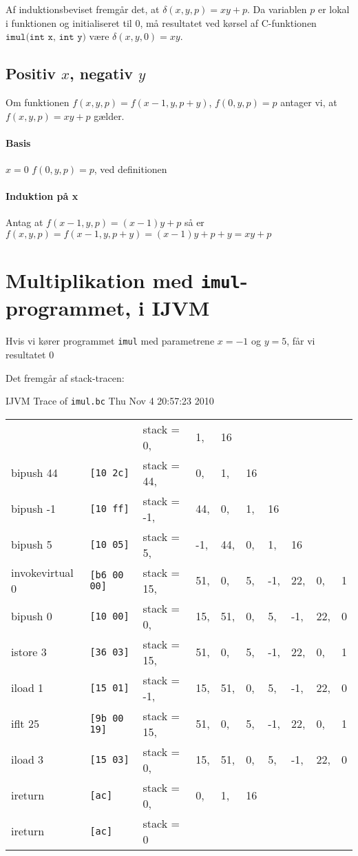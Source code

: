 \documentclass[12pt,a4paper]{article}
\newcommand{\imul}{\texttt{imul}}
\begin{document}
Af induktionsbeviset fremgår det, at $\delta(x,y,p)=xy+p$. Da variablen $p$ er
lokal i funktionen og initialiseret til $0$, må resultatet ved kørsel af
C-funktionen $\texttt{imul(int x, int y)}$ være $\delta(x,y,0)=xy$.

\subsection{Positiv $x$, negativ $y$}

Om funktionen $f(x, y, p) = f(x-1, y, p+y)$, $f(0, y, p) = p$ antager vi, at $f(x, y, p) = xy+p$ gælder.
\paragraph{Basis} $x = 0$
$f(0, y, p) = p$, ved definitionen
\paragraph{Induktion på x}
Antag at $f(x-1, y, p) = (x-1)y+p$
så er $f(x, y, p) = f(x-1, y, p+y) = (x-1)y+p+y = xy+p$



\section{Multiplikation med \imul{}-programmet, i IJVM}
Hvis vi kører programmet \imul{} med parametrene $x=-1$ og $y=5$, får vi resultatet $0$

Det fremgår af stack-tracen:

IJVM Trace of \texttt{imul.bc} Thu Nov  4 20:57:23 2010

\begin{tabular}{llllllllll}
                &                    & stack = 0,& 1,& 16 \\
bipush 44       & \texttt{[10 2c]   }& stack = 44,& 0,& 1,& 16 \\
bipush -1       & \texttt{[10 ff]   }& stack = -1,& 44,& 0,& 1,& 16 \\
bipush 5        & \texttt{[10 05]   }& stack = 5,& -1,& 44,& 0,& 1,& 16 \\
invokevirtual 0 & \texttt{[b6 00 00]}& stack = 15,& 51,& 0,& 5,& -1,& 22,& 0,& 1 \\
bipush 0        & \texttt{[10 00]   }& stack = 0,& 15,& 51,& 0,& 5,& -1,& 22,& 0 \\
istore 3        & \texttt{[36 03]   }& stack = 15,& 51,& 0,& 5,& -1,& 22,& 0,& 1 \\
iload 1         & \texttt{[15 01]   }& stack = -1,& 15,& 51,& 0,& 5,& -1,& 22,& 0 \\
iflt 25         & \texttt{[9b 00 19]}& stack = 15,& 51,& 0,& 5,& -1,& 22,& 0,& 1 \\
iload 3         & \texttt{[15 03]   }& stack = 0,& 15,& 51,& 0,& 5,& -1,& 22,& 0 \\
ireturn         & \texttt{[ac]      }& stack = 0,& 0,& 1,& 16 \\
ireturn         & \texttt{[ac]      }& stack = 0
\end{tabular}
\end{document}
